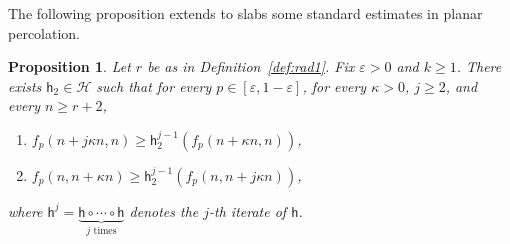 \documentclass[12pt, twoside,a4paper,reqno]{amsart}
\theoremstyle{plain}
\newtheorem{proposition}[theorem]{Proposition}
\theoremstyle{remark}
\theoremstyle{definition}
\newcommand{\eps}{\varepsilon}
\begin{document}
The following proposition extends to slabs some standard estimates in planar
percolation.

\begin{proposition}
  \label{prop:standard-inequality} Let $r$ be as in Definition~\ref{def:rad1}.
  Fix $\eps>0$ and $k \geq 1$. There exists $\mathsf{h}_{2}\in \mathcal{H}$ such
  that for every $p \in [\eps, 1-\eps]$, for every $\kappa >0$, $j\geq 2$, and every
  $n\geq r+2$,
\begin{enumerate}[\bf 1.]
\item\label{item:1} $f_p(n+j\kappa n,n)\geq \mathsf h_2^{j-1} (f_p(n+\kappa n,n))$,

\item\label{item:2} $f_p(n,n+\kappa n)\geq \mathsf
  h_2^{j-1}(f_p(n,n+j\kappa n))$,

\end{enumerate}
where $\mathsf h^{j}=\underbrace{\mathsf h\circ\cdots\circ \mathsf
  h}_{j \text{ times}}$ denotes the $j$-th iterate of $\mathsf h$.
\end{proposition}
\end{document}
